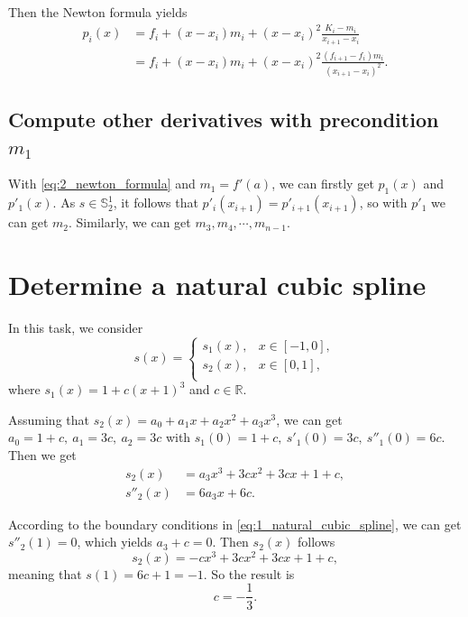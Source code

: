 \documentclass[a4paper]{article}
\begin{document}
Then the Newton formula yields
\begin{equation}
  \begin{aligned}
    p_i(x) &= f_i + (x - x_i)m_i + (x - x_i)^2 \frac{K_i - m_i}{x_{i + 1} - x_i} \\
    &= f_i + (x - x_i)m_i + (x - x_i)^2 \frac{(f_{i + 1} - f_i)m_i}{(x_{i + 1} - x_i)^2}.
  \end{aligned}
  \label{eq:2_newton_formula}
\end{equation}

\subsection{Compute other derivatives with precondition $m_1$}

With \cref{eq:2_newton_formula} and $m_1 = f'(a)$, we can firstly get $p_1(x)$ and $p'_1(x)$.
As $s \in \mathbb{S}_2^1$, it follows that $p'_i(x_{i + 1}) = p'_{i + 1}(x_{i + 1})$, so with $p'_1$ we can get $m_2$. Similarly, we can get $m_3, m_4, \cdots, m_{n - 1}$.

\section{Determine a natural cubic spline}

In this task, we consider 
\begin{equation}
  s(x) = \begin{cases}
    s_1(x),& x \in [-1, 0], \\
    s_2(x),& x \in [0, 1], \\
  \end{cases}
\end{equation}
where $s_1(x) = 1 + c(x + 1)^3$ and $c \in \mathbb{R}$.

Assuming that $s_2(x) = a_0 + a_1 x + a_2 x^2 + a_3 x^3$, we can get $a_0 = 1 + c,\ a_1 = 3c,\ a_2 = 3c$ with $s_1(0) = 1 + c,\ s'_1(0) = 3c,\ s''_1(0) = 6c$. 
Then we get 
\begin{equation}
  \begin{aligned}
    s_2(x) &= a_3x^3 + 3cx^2 + 3cx + 1 + c, \\
    s''_2(x) &= 6a_3x + 6c.
  \end{aligned}
  \label{eq:3_s2_coefficients}
\end{equation}

According to the boundary conditions in \cref{eq:1_natural_cubic_spline}, we can get $s''_2(1) = 0$, which yields $a_3 + c = 0$. Then $s_2(x)$ follows
\begin{equation}
  s_2(x) = -cx^3 + 3cx^2 + 3cx + 1 + c,
  \label{eq:3_s2_solution}
\end{equation}
meaning that $s(1) = 6c + 1 = -1$. So the result is 
\begin{equation}
  c = -\frac{1}{3}.
  \label{eq:3_c_result}
\end{equation}
\end{document}
